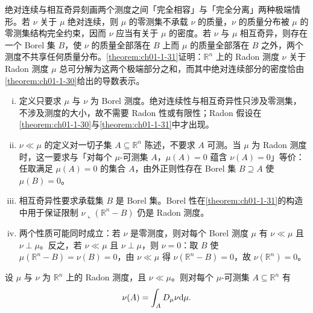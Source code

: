 \documentclass[../../main.tex]{subfiles}%
\begin{document}
\begin{remark}\label{remark:ch01-def-1-22-动机}
绝对连续与相互奇异刻画两个测度之间「完全相容」与「完全分离」两种极端情形。若 $\nu$ 关于 $\mu$ 绝对连续，则 $\mu$ 的零测集不承载 $\nu$ 的质量，$\nu$ 的质量分布被 $\mu$ 的零测集结构完全约束，因而 $\nu$ 应当有关于 $\mu$ 的密度。若 $\nu$ 与 $\mu$ 相互奇异，则存在一个 Borel 集 $B$，使 $\nu$ 的质量全部落在 $B$ 上而 $\mu$ 的质量全部落在 $B$ 之外，两个测度不共享任何质量分布。\cref{theorem:ch01-1-31}证明：$\mathbb{R}^n$ 上的 Radon 测度 $\nu$ 关于 Radon 测度 $\mu$ 总可分解为这两个极端部分之和，而其中绝对连续部分的密度恰由\cref{theorem:ch01-1-30}给出的导数表示。%
\end{remark}

\begin{remark}\label{remark:ch01-def-1-22-条件}
\begin{enumerate}[(i)]
\item 定义只要求 $\mu$ 与 $\nu$ 为 Borel 测度。绝对连续性与相互奇异性只涉及零测集，不涉及测度的大小，故不需要 Radon 性或有限性；Radon 假设在\cref{theorem:ch01-1-30}与\cref{theorem:ch01-1-31}中才出现。%
\item $\nu\ll\mu$ 的定义对一切子集 $A\subseteq\mathbb{R}^n$ 陈述，不要求 $A$ 可测。当 $\mu$ 为 Radon 测度时，这一要求与「对每个 $\mu$-可测集 $A$，$\mu(A)=0$ 蕴含 $\nu(A)=0$」等价：任取满足 $\mu(A)=0$ 的集合 $A$，由外正则性存在 Borel 集 $B\supseteq A$ 使 $\mu(B)=0$。
\item 相互奇异性要求承载集 $B$ 是 Borel 集。Borel 性在\cref{theorem:ch01-1-31}的构造中用于保证限制 $\nu\llcorner(\mathbb{R}^n-B)$ 仍是 Radon 测度。%
\item 两个性质可能同时成立：若 $\nu$ 是零测度，则对每个 Borel 测度 $\mu$ 有 $\nu\ll\mu$ 且 $\nu\perp\mu$。反之，若 $\nu\ll\mu$ 且 $\nu\perp\mu$，则 $\nu=0$：取 $B$ 使 $\mu(\mathbb{R}^n-B)=\nu(B)=0$，由 $\nu\ll\mu$ 得 $\nu(\mathbb{R}^n-B)=0$，故 $\nu(\mathbb{R}^n)=0$。
\end{enumerate}
\end{remark}

\begin{theorem}\label{theorem:ch01-1-30}
设 $\mu$ 与 $\nu$ 为 $\mathbb{R}^n$ 上的 Radon 测度，且 $\nu\ll\mu$。则对每个 $\mu$-可测集 $A\subseteq\mathbb{R}^n$ 有
\begin{align*}
\nu(A)=\int_A D_{\mu}\nu\mathrm{d}\mu .
\end{align*}
\end{theorem}
\end{document}
